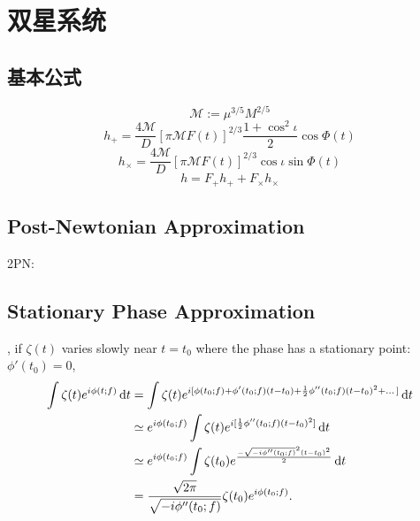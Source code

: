 \chapter{双星系统}

\section{基本公式}

\def\M{\mathcal{M}}
\begin{equation}
    \M:=\mu^{3/5}M^{2/5}
\end{equation}
\begin{equation}
    h_+=\frac{4\M}{D}[\pi \M F(t)]^{2/3}\frac{1+\cos^2\iota}{2}\cos\Phi(t)
\end{equation}
\begin{equation}
    h_\times=\frac{4\M}{D}[\pi \M F(t)]^{2/3}\cos\iota\sin\Phi(t)
\end{equation}
\begin{equation}
    h=F_+h_++F_\times h_\times
\end{equation}

\section{Post-Newtonian Approximation}

2PN: \cite{Blanchet1995,Poisson1995}

\section{Stationary Phase Approximation}

\cite{Poisson1995}, if $\zeta(t)$ varies slowly near $t=t_0$ where the phase has a stationary point: $\phi'(t_0)=0$,
\begin{align}
    \int\zeta(t)e^{i\phi(t;f)}\,\mathrm{d} t&=\int\zeta(t)e^{i[\phi(t_0;f)+\phi'(t_0;f)(t-t_0)+\frac{1}{2}\phi''(t_0;f)(t-t_0)^2+\dots]}\,\mathrm{d} t\\
    &\simeq e^{i\phi(t_0;f)}\int\zeta(t)e^{i[\frac{1}{2}\phi''(t_0;f)(t-t_0)^2]}\,\mathrm{d} t\\
    &\simeq e^{i\phi(t_0;f)}\int\zeta(t_0)e^{\frac{-\sqrt{-i\phi''(t_0;f)}^2(t-t_0)^2}{2}}\,\mathrm{d} t\\
    &=\frac{\sqrt{2\pi}}{\sqrt{-i\phi''(t_0;f)}}\zeta(t_0)e^{i\phi(t_0;f)}.
\end{align}
